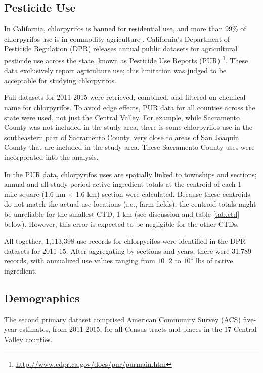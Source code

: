 \documentclass[ijerph,article,submit,oneauthor,pdftex]{Definitions/mdpi}
\begin{document}
\hypertarget{pesticide-use}{%
\subsection{Pesticide Use}\label{pesticide-use}}

In California, chlorpyrifos is banned for residential use, and more than 99\% of chlorpyrifos use is in commodity agriculture \citet[table 2]{SegawaEvaluationOptionsInterim2017}. California's Department of Pesticide Regulation (DPR) releases annual public datasets for agricultural pesticide use across the state, known as Pesticide Use Reports (PUR) \footnote{\url{http://www.cdpr.ca.gov/docs/pur/purmain.htm}}. These data exclusively report agriculture use; this limitation was judged to be acceptable for studying chlorpyrifos.

Full datasets for 2011-2015 were retrieved, combined, and filtered on chemical name for chlorpyrifos. To avoid edge effects, PUR data for all counties across the state were used, not just the Central Valley. For example, while Sacramento County was not included in the study area, there is some chlorpyrifos use in the southeastern part of Sacramento County, very close to areas of San Joaquin County that are included in the study area. These Sacramento County uses were incorporated into the analysis.

In the PUR data, chlorpyrifos uses are spatially linked to townships and sections; annual and all-study-period active ingredient totals at the centroid of each 1 mile-square (1.6 km \(\times\) 1.6 km) section were calculated. Because these centroids do not match the actual use locations (i.e., farm fields), the centroid totals might be unreliable for the smallest CTD, 1 km (see discussion and table \ref{tab.ctd} below). However, this error is expected to be negligible for the other CTDs.

All together, 1,113,398 use records for chlorpyrifos were identified in the DPR datasets for 2011-15. After aggregating by sections and years, there were 31,789 records, with annualized use values ranging from \(10^-2\) to \(10^4\) lbs of active ingredient.

\hypertarget{demographics}{%
\subsection{Demographics}\label{demographics}}

The second primary dataset comprised American Community Survey (ACS) five-year estimates, from 2011-2015, for all Census tracts and places in the 17 Central Valley counties.
\end{document}
